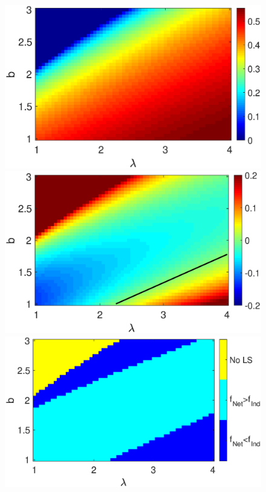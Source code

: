 \begin{figure}[h]
  \begin{minipage}{0.32\linewidth}
            \begin{center}
             \includegraphics[width=1\linewidth]{Images/photo19_1.eps}
            \end{center}
        \end{minipage} 
        \begin{minipage}{0.32\linewidth}
            \begin{center}
                \includegraphics[width=1\linewidth]{Images/photo19_2.eps}
            \end{center}
        \end{minipage} 
        \begin{minipage}{0.32\linewidth}
            \begin{center}
                \includegraphics[width=1\linewidth]{Images/photo19_3.eps}

\end{center}
\end{minipage}
\end{figure}
